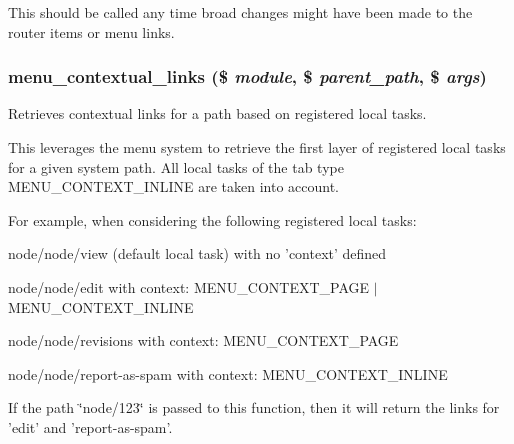 This should be called any time broad changes might have been made to the router items or menu links. \hypertarget{group__menu_gad524d9a3415e24d27c7dbcb333d96cf8}{
\subsubsection[{menu\_\-contextual\_\-links}]{\setlength{\rightskip}{0pt plus 5cm}menu\_\-contextual\_\-links (\$ {\em module}, \/  \$ {\em parent\_\-path}, \/  \$ {\em args})}}
\label{group__menu_gad524d9a3415e24d27c7dbcb333d96cf8}
Retrieves contextual links for a path based on registered local tasks.

This leverages the menu system to retrieve the first layer of registered local tasks for a given system path. All local tasks of the tab type MENU\_\-CONTEXT\_\-INLINE are taken into account.

For example, when considering the following registered local tasks:
\begin{DoxyItemize}
\item node/node/view (default local task) with no 'context' defined
\item node/node/edit with context: MENU\_\-CONTEXT\_\-PAGE $|$ MENU\_\-CONTEXT\_\-INLINE
\item node/node/revisions with context: MENU\_\-CONTEXT\_\-PAGE
\item node/node/report-\/as-\/spam with context: MENU\_\-CONTEXT\_\-INLINE
\end{DoxyItemize}

If the path \char`\"{}node/123\char`\"{} is passed to this function, then it will return the links for 'edit' and 'report-\/as-\/spam'.


